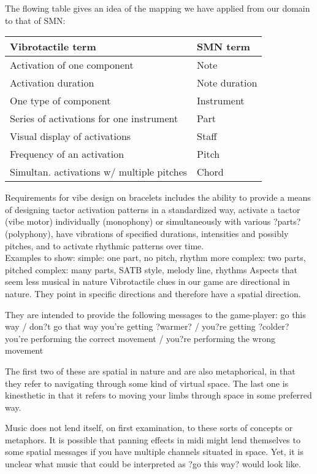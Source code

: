 \documentclass[a4paper, twocolumn]{article}
\begin{document}
The flowing table gives an idea of the mapping we have applied from our domain to that of SMN:

\begin{table}[h]
\centering
\begin{tabular}{@{}ll@{}}
\toprule
Vibrotactile term & SMN term \\ \midrule
Activation of one component & Note \\
Activation duration & Note duration \\
One type of component & Instrument \\
Series of activations for one instrument & Part \\
Visual display of activations & Staff \\
Frequency of an activation & Pitch \\
Simultan. activations w/ multiple pitches & Chord \\ \bottomrule

\end{tabular}
\end{table}

Requirements for vibe design on bracelets includes the ability to provide a means of designing tactor activation patterns in a standardized way, activate a tactor (vibe motor) individually (monophony) or simultaneously with various ?parts? (polyphony), have vibrations of specified durations, intensities and possibly pitches, and to activate rhythmic patterns over time.\\

Examples to show:
simple: one part, no pitch, rhythm
more complex: two parts, pitched
complex: many parts, SATB style, melody line, rhythms
Aspects that seem less musical in nature
Vibrotactile clues in our game are directional in nature. They point in specific directions and therefore have a spatial direction. 

They are intended to provide the following messages to the game-player:
go this way / don?t go that way
you're getting ?warmer? / you?re getting ?colder?
you're performing the correct movement / you?re performing the wrong movement

The first two of these are spatial in nature and are also metaphorical, in that they refer to navigating through some kind of virtual space. The last one is kinesthetic in that it refers to moving your limbs through space in some preferred way.

Music does not lend itself, on first examination, to these sorts of concepts or metaphors. It is possible that panning effects in midi might lend themselves to some spatial messages if you have multiple channels situated in space. Yet, it is unclear what music that could be interpreted as ?go this way? would look like. 
\end{document}
